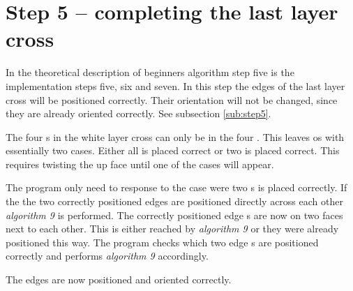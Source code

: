 \section{Step 5 -- completing the last layer cross}
In the theoretical description of beginners algorithm step five is the implementation steps five, six and seven. 
In this step the edges of the last layer cross will be positioned correctly. Their orientation will not be changed, since they are already oriented correctly. See subsection \ref{sub:step5}.

The four \cpiece{}s in the white layer cross can only be in the four \cubicle{}. This leaves os with essentially two cases. Either all is placed correct or two is placed correct. This requires twisting the up face until one of the cases will appear. 

The program only need to response to the case were two \cpiece{}s is placed correctly. 
If the the two correctly positioned edges are positioned directly across each other \textit{algorithm 9} is performed.
The correctly positioned edge \cpiece{}s are now on two faces next to each other. This is either reached by \textit{algorithm 9} or they were already positioned this way.
The program checks which two edge \cpiece{}s are positioned correctly and performs \textit{algorithm 9} accordingly. 

The edges are now positioned and oriented correctly.